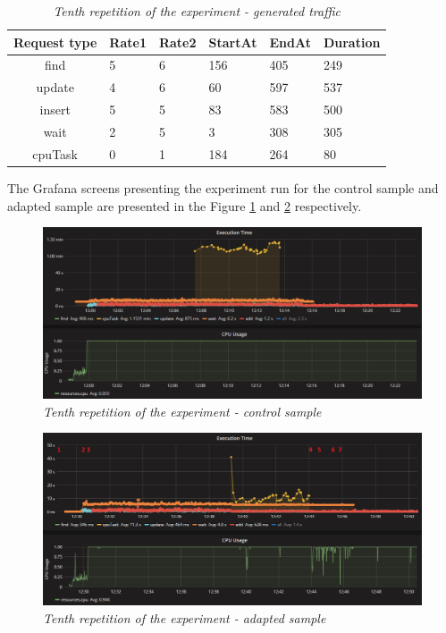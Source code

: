 \documentclass[12pt,a4paper]{article}
\begin{document}
\begin{table}[ht]
\begin{center}
\begin{tabular}{c|C{2cm}|C{2cm}|C{2cm}|C{2cm}|C{2cm}}
\textbf{Request type} & \textbf{Rate1} & \textbf{Rate2} & \textbf{StartAt} & \textbf{EndAt} & \textbf{Duration}\\\hline
find	&5	&6	&156	&405	&249\\\hline
update	&4	&6	&60	    &597	&537\\\hline
insert	&5	&5	&83	    &583	&500\\\hline
wait	&2	&5	&3	    &308	&305\\\hline
cpuTask	&0	&1	&184	&264	&80
\end{tabular}
\end{center}
\caption{\textit{Tenth repetition of the experiment - generated traffic}} \label{table:random:traffic:10}
\end{table}

The Grafana screens presenting the experiment run for the control sample and adapted sample are presented in the Figure \ref{figure:random:screen:control:10} and \ref{figure:random:screen:adapted:10} respectively. 

\begin{figure}[!htb]
\centering
\includegraphics[width=1\textwidth]{10-ctrl}
\caption{\textit{Tenth repetition of the experiment - control sample}} \label{figure:random:screen:control:10}
\end{figure}

\begin{figure}[!htb]
\centering
\includegraphics[width=1\textwidth]{10-adap}
\caption{\textit{Tenth repetition of the experiment - adapted sample}} \label{figure:random:screen:adapted:10}
\end{figure}
\end{document}
